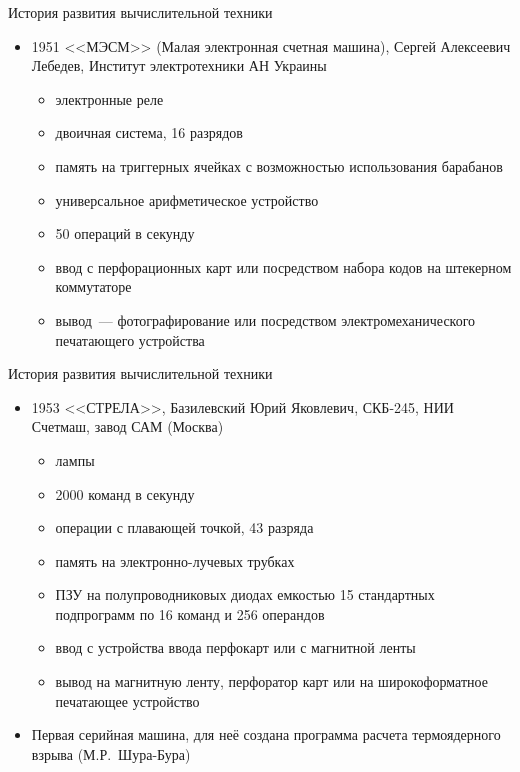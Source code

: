 \documentclass[aspectratio=169,14pt]{beamer}
\begin{document}
\begin{frame}{История развития вычислительной техники}
    \begin{itemize}
        \item 1951 <<МЭСМ>> (Малая электронная счетная машина), Сергей Алексеевич Лебедев,
        Институт электротехники АН Украины
        \begin{itemize}
            \item электронные реле
            \item двоичная система, 16 разрядов
            \item память на триггерных ячейках с возможностью использования барабанов
            \item универсальное арифметическое устройство
            \item 50 операций в секунду
            \item ввод с перфорационных карт или посредством набора кодов
            на штекерном коммутаторе
            \item вывод~--- фотографирование или посредством электромеханического
            печатающего устройства
        \end{itemize}
    \end{itemize}
\end{frame}

\begin{frame}{История развития вычислительной техники}
    \begin{itemize}
        \item 1953 <<СТРЕЛА>>, Базилевский Юрий Яковлевич, СКБ-245, НИИ Счетмаш,
        завод САМ (Москва)
        \begin{itemize}
            \item лампы
            \item 2000 команд в секунду
            \item операции с плавающей точкой, 43 разряда
            \item память на электронно-лучевых трубках
            \item ПЗУ на полупроводниковых диодах емкостью 15 стандартных
            подпрограмм по 16 команд и 256 операндов
            \item ввод с устройства ввода перфокарт или с магнитной ленты
            \item вывод на магнитную ленту, перфоратор карт или на широкоформатное
            печатающее устройство
        \end{itemize}
        \item Первая серийная машина, для неё создана
        программа расчета термоядерного взрыва (М.Р.~Шура-Бура)
    \end{itemize}
\end{frame}
\end{document}
